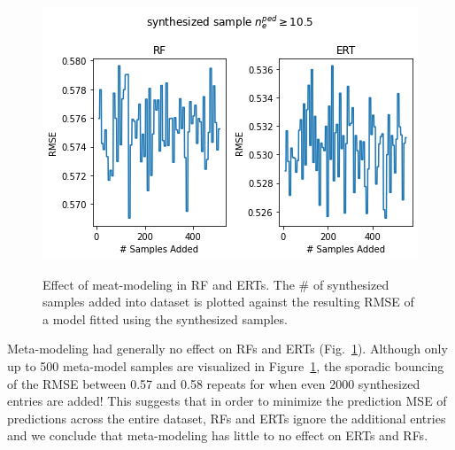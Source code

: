 \documentclass[a4paper, twoside, final, 12pt]{article}
\begin{document}
{\begin{figure}
		\centering
		\vspace{-18pt}
		\caption{Effect of meat-modeling in RF and ERTs. The \# of synthesized samples added into dataset is plotted against the resulting RMSE of a model fitted using the synthesized samples.}
		\includegraphics[width=\linewidth, keepaspectratio=true, trim=0 0 0 30, clip]{./src/ERT_vs_RF_meta_modeling}
		\vspace{-22pt}
		\label{fig:RF_meta_model}
\end{figure}
Meta-modeling had generally no effect on RFs and ERTs (Fig.~\ref{fig:RF_meta_model}).
Although only up to 500 meta-model samples are visualized in Figure~\ref{fig:RF_meta_model}, the sporadic bouncing of the RMSE between 0.57 and 0.58 repeats for when even 2000 synthesized entries are added!
This suggests that in order to minimize the prediction MSE of predictions across the entire dataset, RFs and ERTs ignore the additional entries and we conclude that meta-modeling has little to no effect on ERTs and RFs.

}
\end{document}
